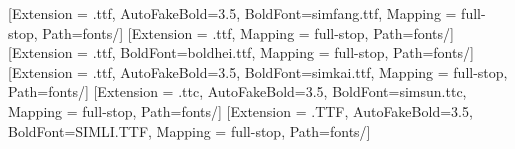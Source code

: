 \usepackage{siunitx}
\usepackage{relsize}
\usepackage{ulem}
\usepackage{array}
\usepackage{float}
\usepackage{cancel}
\usepackage{stackengine}
\stackMath


\usepackage{pifont}


\newCJKfontfamily{}[Extension = .ttf, AutoFakeBold=3.5, BoldFont=simfang.ttf, Mapping = full-stop, Path=fonts/]
\newCJKfontfamily{}[Extension = .ttf, Mapping = full-stop, Path=fonts/]
\newCJKfontfamily{}[Extension = .ttf, BoldFont=boldhei.ttf, Mapping = full-stop, Path=fonts/]
\newCJKfontfamily{}[Extension = .ttf, AutoFakeBold=3.5, BoldFont=simkai.ttf, Mapping = full-stop, Path=fonts/]
\newCJKfontfamily{}[Extension = .ttc, AutoFakeBold=3.5, BoldFont=simsun.ttc, Mapping = full-stop, Path=fonts/]
\newCJKfontfamily{}[Extension = .TTF, AutoFakeBold=3.5, BoldFont=SIMLI.TTF, Mapping = full-stop, Path=fonts/]




